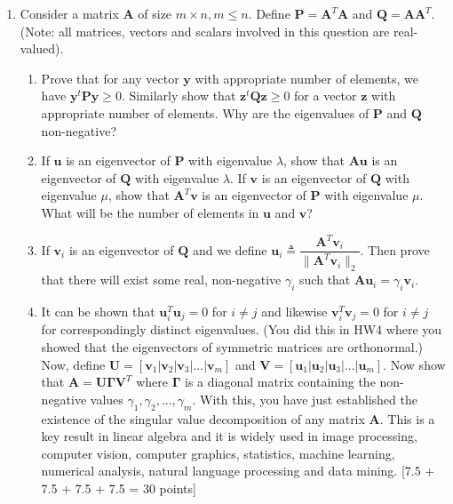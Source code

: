 \documentclass[11pt]{article}
\begin{document}
\begin{enumerate}
\item Consider a matrix $\boldsymbol{A}$ of size $m \times n, m \leq n$. Define $\boldsymbol{P} = \boldsymbol{A}^T \boldsymbol{A}$ and $\boldsymbol{Q} = \boldsymbol{A}\boldsymbol{A}^T$. (Note: all matrices, vectors and scalars involved in this question are real-valued).
\begin{enumerate}
\item Prove that for any vector $\boldsymbol{y}$ with appropriate number of elements, we have $\boldsymbol{y}^t \boldsymbol{Py} \geq 0$. Similarly show that $\boldsymbol{z}^t \boldsymbol{Qz} \geq 0$ for a vector $\boldsymbol{z}$ with appropriate number of elements. Why are the eigenvalues of $\boldsymbol{P}$ and $\boldsymbol{Q}$ non-negative?
\item If $\boldsymbol{u}$ is an eigenvector of $\boldsymbol{P}$ with eigenvalue $\lambda$, show that $\boldsymbol{Au}$ is an eigenvector of $\boldsymbol{Q}$ with eigenvalue $\lambda$. If $\boldsymbol{v}$ is an eigenvector of $\boldsymbol{Q}$ with eigenvalue $\mu$, show that $\boldsymbol{A}^T\boldsymbol{v}$ is an eigenvector of $\boldsymbol{P}$ with eigenvalue $\mu$. What will be the number of elements in $\boldsymbol{u}$ and $\boldsymbol{v}$?

\item If $\boldsymbol{v}_i$ is an eigenvector of $\boldsymbol{Q}$ and we define $\boldsymbol{u}_i \triangleq \dfrac{\boldsymbol{A}^T \boldsymbol{v}_i}{\|\boldsymbol{A}^T \boldsymbol{v}_i\|_2}$. Then prove that there will exist some real, non-negative $\gamma_i$ such that $\boldsymbol{Au}_i = \gamma_i \boldsymbol{v}_i$.

\item It can be shown that $\boldsymbol{u}^T_i \boldsymbol{u}_j = 0$ for $i \neq j$ and likewise $\boldsymbol{v}^T_i \boldsymbol{v}_j = 0$ for $i \neq j$ for correspondingly distinct eigenvalues. (You did this in HW4 where you showed that the eigenvectors of symmetric matrices are orthonormal.) Now, define $\boldsymbol{U} = [\boldsymbol{v}_1 | \boldsymbol{v}_2 | \boldsymbol{v}_3 | ...|\boldsymbol{v}_m]$ and $\boldsymbol{V} = [\boldsymbol{u}_1 | \boldsymbol{u}_2 | \boldsymbol{u}_3 | ... |\boldsymbol{u}_m]$. Now show that $\boldsymbol{A} = \boldsymbol{U} \boldsymbol{\Gamma} \boldsymbol{V}^T$ where $\boldsymbol{\Gamma}$ is a diagonal matrix containing the non-negative values $\gamma_1, \gamma_2, ..., \gamma_m$. With this, you have just established the existence of the singular value decomposition of any matrix $\boldsymbol{A}$. This is a key result in linear algebra and it is widely used in image processing, computer vision, computer graphics, statistics, machine learning, numerical analysis, natural language processing and data mining. \textsf[7.5 + 7.5 + 7.5 + 7.5 = 30 points]
\end{enumerate}


\end{enumerate}
\end{document}
